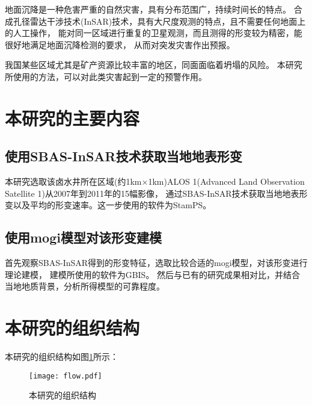 地面沉降是一种危害严重的自然灾害，具有分布范围广，持续时间长的特点。
合成孔径雷达干涉技术(InSAR)技术，具有大尺度观测的特点，且不需要任何地面上的人工操作，
能对同一区域进行重复的卫星观测，而且测得的形变较为精密，能很好地满足地面沉降检测的要求，
从而对突发灾害作出预报。

我国某些区域尤其是矿产资源比较丰富的地区，同面面临着坍塌的风险。
本研究所使用的方法，可以对此类灾害起到一定的预警作用。

\section{本研究的主要内容}

\subsection{使用SBAS-InSAR技术获取当地地表形变}

本研究选取该卤水井所在区域(约1km×1km)ALOS 1(Advanced Land Observation Satellite 1)从2007年到2011年的15幅影像，
通过SBAS-InSAR技术获取当地地表形变以及平均的形变速率。这一步使用的软件为StamPS。

\subsection{使用mogi模型对该形变建模}

首先观察SBAS-InSAR得到的形变特征，选取比较合适的mogi模型，对该形变进行理论建模，
建模所使用的软件为GBIS。
然后与已有的研究成果相对比，并结合当地地质背景，分析所得模型的可靠程度。

\section{本研究的组织结构}

本研究的组织结构如图\ref{fig:flow}所示：

\begin{figure}[htb]
  \centering
  \texttt{[image: flow.pdf]}
  \caption{本研究的组织结构}
  \label{fig:flow}
\end{figure}